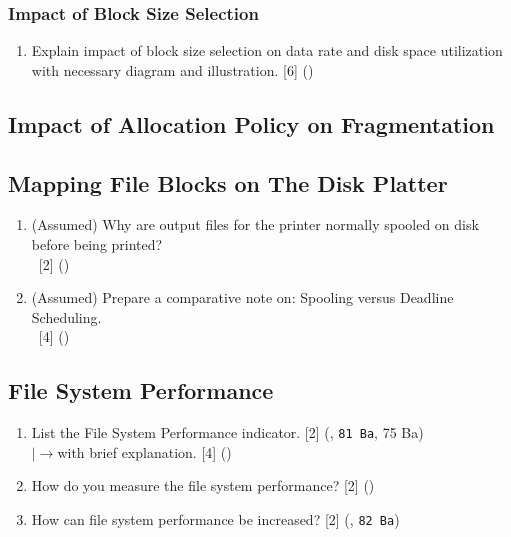 \documentclass[12pt]{article}
\newcommand{\lb}{\\$\left|\rightarrow\right.$}
\newcommand{\enter}{\\\textcolor{white}{1}}
\begin{document}
		\subsubsection{Impact of Block Size Selection}
			\begin{enumerate}[noitemsep, topsep=0pt]
				\item Explain impact of block size selection on data rate and disk space utilization with necessary diagram and illustration. \hfill [6] ()
			\end{enumerate}

	\subsection{Impact of Allocation Policy on Fragmentation}
	\subsection{Mapping File Blocks on The Disk Platter}
		\begin{enumerate}[noitemsep, topsep=0pt]
			\item (Assumed) Why are output files for the printer normally spooled on disk before being printed?
			\enter\hfill [2] ()

			\item (Assumed) Prepare a comparative note on: Spooling versus Deadline Scheduling.
			\enter\hfill [4] ()
		\end{enumerate}
		
	\subsection{File System Performance}
		\begin{enumerate}[noitemsep, topsep=0pt]
			\item List the File System Performance indicator. \hfill [2] (, \texttt{81 Ba}, 75 Ba)
			\lb with brief explanation. \hfill [4] ()

			\item How do you measure the file system performance? \hfill [2] ()
			
			\item How can file system performance be increased? \hfill [2] (, \texttt{82 Ba})
		\end{enumerate}
\end{document}
